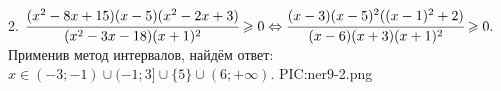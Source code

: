 2. $\cfrac{(x^2-8x+15)(x-5)(x^2-2x+3)}{(x^2-3x-18)(x+1)^2}\geqslant0\Leftrightarrow\cfrac{(x-3)(x-5)^2((x-1)^2+2)}{(x-6)(x+3)(x+1)^2}\geqslant0.$ Применив метод интервалов, найдём ответ: $x\in(-3;-1)\cup(-1;3]\cup\{5\}\cup(6;+\infty).$
{{PIC:ner9-2.png}}\\
